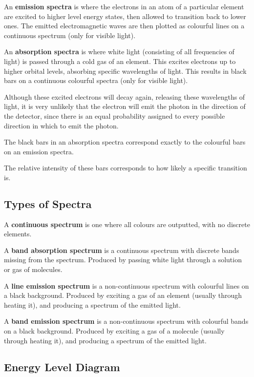 \documentclass[a4paper,11pt]{report}
\begin{document}
An \textbf{emission spectra} is where the electrons in an atom of a particular
element are excited to higher level energy states, then allowed to transition
back to lower ones. The emitted electromagnetic waves are then plotted as
colourful lines on a continuous spectrum (only for visible light).

An \textbf{absorption spectra} is where white light (consisting of all
frequencies of light) is passed through a cold gas of an element. This excites
electrons up to higher orbital levels, absorbing specific wavelengths of light.
This results in black bars on a continuous colourful spectra (only for visible
light).

Although these excited electrons will decay again, releasing these wavelengths
of light, it is very unlikely that the electron will emit the photon in the
direction of the detector, since there is an equal probability assigned to
every possible direction in which to emit the photon.

The black bars in an absorption spectra correspond exactly to the colourful
bars on an emission spectra.

The relative intensity of these bars corresponds to how likely a specific
transition is.

\subsection{Types of Spectra}

A \textbf{continuous spectrum} is one where all colours are outputted, with
no discrete elements.

A \textbf{band absorption spectrum} is a continuous spectrum with discrete bands
missing from the spectrum. Produced by passing white light through a solution
or gas of molecules.

A \textbf{line emission spectrum} is a non-continuous spectrum with colourful
lines on a black background. Produced by exciting a gas of an element (usually
through heating it), and producing a spectrum of the emitted light.

A \textbf{band emission spectrum} is a non-continuous spectrum with colourful
bands on a black background. Produced by exciting a gas of a molecule (usually
through heating it), and producing a spectrum of the emitted light.

\subsection{Energy Level Diagram}
\end{document}
